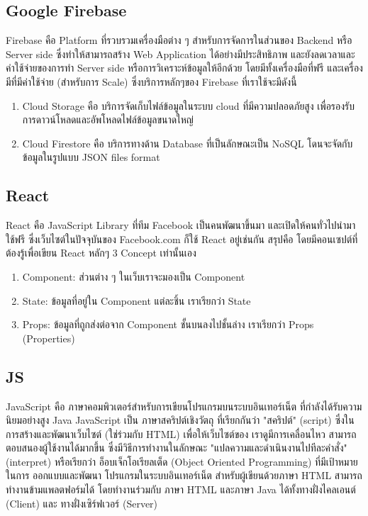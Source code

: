 \subsection{Google Firebase}
Firebase คือ Platform ที่รวบรวมเครื่องมือต่าง ๆ สำหรับการจัดการในส่วนของ Backend หรือ Server side
ซึ่งทำให้สามารถสร้าง Web Application ได้อย่างมีประสิทธิภาพ และยังลดเวลาและค่าใช้จ่ายของการทำ Server side
หรือการวิเคราะห์ข้อมูลให้อีกด้วย โดยมีทั้งเครื่องมือที่ฟรี และเครื่องมีที่มีค่าใช้จ่าย (สำหรับการ Scale) ซึ่งบริการหลักๆของ
Firebase ที่เราใช้จะมีดังนี้~\cite{fs-doc}

\begin{enumerate}
  \item Cloud Storage คือ บริการจัดเก็บไฟล์ข้อมูลในระบบ cloud ที่มีความปลอดภัยสูง เพื่อรองรับการดาวน์โหลดและอัพโหลดไฟล์ข้อมูลขนาดใหญ่
  \item Cloud Firestore คือ บริการทางด้าน Database ที่เป็นลักษณะเป็น NoSQL โดนจะจัดกับข้อมูลในรูปแบบ JSON files format
\end{enumerate}

\subsection{React}
React คือ JavaScript Library ที่ทีม Facebook เป็นคนพัฒนาขึ้นมา และเปิดให้คนทั่วไปนำมาใช้ฟรี ซึ่งเว็บไซต์ในปัจจุบันของ
Facebook.com ก็ใช้ React อยู่เช่นกัน สรุปคือ โดยมีคอนเซปต์ที่ต้องรู้เพื่อเขียน React หลักๆ 3 Concept เท่านั้นเอง~\cite{react-doc}

\begin{enumerate}
  \item Component: ส่วนต่าง ๆ ในเว็บเราจะมองเป็น Component
  \item State: ข้อมูลที่อยู่ใน Component แต่ละชิ้น เราเรียกว่า State
  \item Props: ข้อมูลที่ถูกส่งต่อจาก Component ชั้นบนลงไปชั้นล่าง เราเรียกว่า Props (Properties)
\end{enumerate}


\subsection{JS}
JavaScript คือ ภาษาคอมพิวเตอร์สำหรับการเขียนโปรแกรมบนระบบอินเทอร์เน็ต ที่กำลังได้รับความนิยมอย่างสูง Java JavaScript
เป็น ภาษาสคริปต์เชิงวัตถุ ที่เรียกกันว่า "สคริปต์" (script) ซึ่งในการสร้างและพัฒนาเว็บไซต์ (ใช่ร่วมกับ HTML) เพื่อให้เว็บไซต์ของ
เราดูมีการเคลื่อนไหว สามารถตอบสนองผู้ใช้งานได้มากขึ้น ซึ่งมีวิธีการทำงานในลักษณะ "แปลความและดำเนินงานไปทีละคำสั่ง"
(interpret) หรือเรียกว่า อ็อบเจ็กโอเรียลเต็ด (Object Oriented Programming) ที่มีเป้าหมายในการ ออกแบบและพัฒนา
โปรแกรมในระบบอินเทอร์เน็ต สำหรับผู้เขียนด้วยภาษา HTML สามารถทำงานข้ามแพลตฟอร์มได้ โดยทำงานร่วมกับ ภาษา HTML และภาษา
Java ได้ทั้งทางฝั่งไคลเอนต์ (Client) และ ทางฝั่งเซิร์ฟเวอร์ (Server)~\cite{js-doc}

